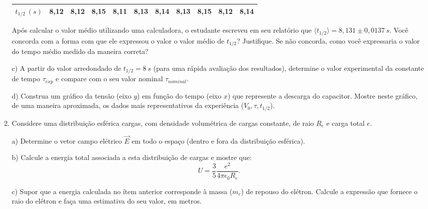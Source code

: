\begin{enumerate}[start=1,label={\bfseries Q\arabic*.}]
\begin{tabular}{|c|c|c|c|c|c|c|c|c|c|c|}
\hline
$t_{1/2} \ (s)$ & 8,12 & 8,12 & 8,15 & 8,11 & 8,13 & 8,14 & 8,13 & 8,15 & 8,12 & 8,14 \\
\hline
\end{tabular}

\noindent Após calcular o valor médio utilizando uma calculadora, o estudante escreveu em seu relatório que $\langle t_{1/2} \rangle = 8,131 \pm 0,0137 \ s$. Você concorda com a forma com que ele expressou o valor o valor médio de $t_{1/2}$? Justifique. Se não concorda, como você expressaria o valor do tempo médio medido da maneira correta?

\resposta

c) A partir do valor arredondado de $t_{1/2} = 8 \ s$ (para uma rápida avaliação dos resultados), determine o valor experimental da constante de tempo $\tau_{exp}$ e compare com o seu valor nominal $\tau_{nominal}$.

\resposta

d) Construa um gráfico da tensão (eixo $y$) em função do tempo (eixo $x$) que represente a descarga do capacitor. Mostre neste gráfico, de uma maneira aproximada, os dados mais representativos da experiência ($V_{0}, \tau, t_{1/2}$).

\resposta



\item Considere uma distribuição esférica cargas, com densidade volumétrica de cargas constante, de raio $R_{e}$ e carga total $e$.

a) Determine o vetor campo elétrico $\vec{E}$ em todo o espaço (dentro e fora da distribuição esférica).

\resposta

b) Calcule a energia total associada a esta distribuição de cargas e mostre que:
$$
U = \frac{3}{5} \frac{e^{2}}{4 \pi \epsilon_{0} R_{e}}.
$$

\resposta

c) Supor que a energia calculada no ítem anterior corresponde à massa ($m_{e}$) de repouso do elétron. Calcule a expressão que fornece o raio do elétron e faça uma estimativa do seu valor, em metros.

\resposta




\end{enumerate}
